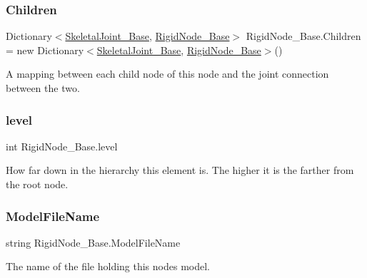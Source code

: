 \subsubsection{\texorpdfstring{Children}{Children}}
{\footnotesize\ttfamily Dictionary$<$\hyperlink{class_skeletal_joint___base}{Skeletal\+Joint\+\_\+\+Base}, \hyperlink{class_rigid_node___base}{Rigid\+Node\+\_\+\+Base}$>$ Rigid\+Node\+\_\+\+Base.\+Children = new Dictionary$<$\hyperlink{class_skeletal_joint___base}{Skeletal\+Joint\+\_\+\+Base}, \hyperlink{class_rigid_node___base}{Rigid\+Node\+\_\+\+Base}$>$()}



A mapping between each child node of this node and the joint connection between the two. 

\mbox{\label{class_rigid_node___base_a762f5fd81893ce03a8c9f28038f7acbe}} 
\subsubsection{\texorpdfstring{level}{level}}
{\footnotesize\ttfamily int Rigid\+Node\+\_\+\+Base.\+level\hspace{0.3cm}{\ttfamily [protected]}}



How far down in the hierarchy this element is. The higher it is the farther from the root node. 

\mbox{\label{class_rigid_node___base_aeb0303b14b3ec98d88a667fe7b61faf5}} 
\subsubsection{\texorpdfstring{Model\+File\+Name}{ModelFileName}}
{\footnotesize\ttfamily string Rigid\+Node\+\_\+\+Base.\+Model\+File\+Name}



The name of the file holding this node\textquotesingle{}s model. 

\mbox{\label{class_rigid_node___base_a90a113d4a7ce35fb515ec7348f48c574}} 
